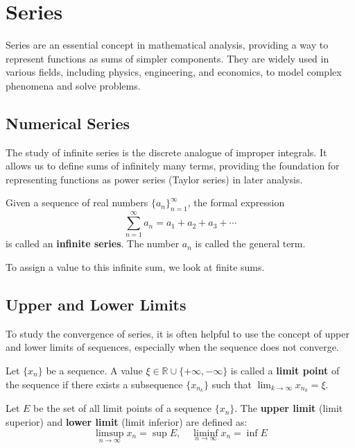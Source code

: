 \documentclass[oneside]{book}
\begin{document}
\section{Series}

Series are an essential concept in mathematical analysis, providing a way to represent functions as sums of simpler components. They are widely used in various fields, including physics, engineering, and economics, to model complex phenomena and solve problems.

\subsection{Numerical Series}

The study of infinite series is the discrete analogue of improper integrals. It allows us to define sums of infinitely many terms, providing the foundation for representing functions as power series (Taylor series) in later analysis.

\begin{definition}
Given a sequence of real numbers $\{a_n\}_{n=1}^{\infty}$, the formal expression
\[ \sum_{n=1}^{\infty} a_n = a_1 + a_2 + a_3 + \cdots \]
is called an \textbf{infinite series}. The number $a_n$ is called the general term.
\end{definition}

To assign a value to this infinite sum, we look at finite sums.

\subsection{Upper and Lower Limits}

To study the convergence of series, it is often helpful to use the concept of upper and lower limits of sequences, especially when the sequence does not converge.

\begin{definition}
Let $\{x_n\}$ be a sequence. A value $\xi \in \mathbb{R} \cup \{+\infty, -\infty\}$ is called a \textbf{limit point} of the sequence if there exists a subsequence $\{x_{n_k}\}$ such that $\lim_{k \to \infty} x_{n_k} = \xi$.
\end{definition}

\begin{definition}
Let $E$ be the set of all limit points of a sequence $\{x_n\}$. The \textbf{upper limit} (limit superior) and \textbf{lower limit} (limit inferior) are defined as:
\[ \limsup_{n \to \infty} x_n = \sup E, \quad \liminf_{n \to \infty} x_n = \inf E \]
\end{definition}
\end{document}

